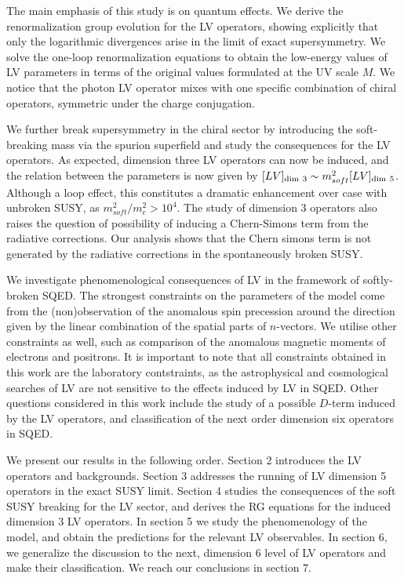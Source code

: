 \documentclass[12pt]{revtex4}
\begin{document}
The main emphasis of this study is on quantum effects. We derive the
renormalization group evolution for the LV operators, showing
explicitly that only the logarithmic divergences arise in the limit of
exact supersymmetry. We solve the one-loop renormalization equations
to obtain the low-energy values of LV parameters in terms of the
original values formulated at the UV scale $M$. We notice that the
photon LV operator mixes with one specific combination of  
chiral operators, symmetric under the charge conjugation. 

We further break supersymmetry in the chiral sector by introducing the 
soft-breaking mass via the spurion superfield and study the consequences for the 
LV operators. As expected, dimension three LV operators can now be induced, and the 
relation between the parameters is now given by 
$[LV]_{\rm dim~3} \sim m_{soft}^2 [LV]_{\rm dim~5}$. 
Although a loop effect, this constitutes a dramatic enhancement over
case with unbroken SUSY, as $ m_{soft}^2/m_e^2 > 10^4$.  
The study of dimension 3 operators also raises the question of possibility of 
inducing  a Chern-Simons term from the radiative corrections.
Our analysis shows that the Chern simons term is not generated by the 
radiative corrections in the spontaneously broken SUSY.

We investigate phenomenological consequences of LV in the framework of
softly-broken SQED. The strongest constraints on the parameters of the
model come from the  (non)observation of the anomalous spin precession
around the direction given by the linear combination of the spatial
parts of $n$-vectors. We utilise other constraints as well,  
such as comparison of the anomalous magnetic moments of electrons and 
positrons. It is important to note that all constraints obtained in this 
work are the laboratory contstraints, as the astrophysical and cosmological 
searches of LV are not sensitive to the effects induced by LV in SQED. 
Other questions considered in this work include the study of a possible $D$-term 
induced by the LV operators, and classification of the next order
dimension six operators in SQED. 

We present our results in the following order. Section 2 introduces
the LV operators and backgrounds. Section 3 addresses the running of
LV dimension 5 operators in the exact SUSY limit. Section 4 studies
the consequences of the soft SUSY breaking for the LV sector, and
derives the RG equations for the induced dimension 3 LV operators.  In
section 5 we study the phenomenology of the model, and obtain the
predictions for the relevant LV observables. In section 6, we
generalize the discussion to the next, dimension 6 level of LV
operators and make their classification. We reach our conclusions in
section 7.  
\end{document}
